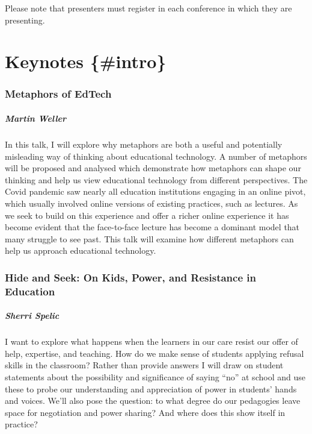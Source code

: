 \documentclass[
]{book}
\begin{document}
Please note that presenters must register in each conference in which they are presenting.

\hypertarget{keynotes-intro}{%
\chapter*{Keynotes \{\#intro\}}\label{keynotes-intro}}

\begin{reflect}
\hypertarget{metaphors-of-edtech}{%
\subsection{Metaphors of EdTech}\label{metaphors-of-edtech}}

\hypertarget{martin-weller}{%
\paragraph{Martin Weller}\label{martin-weller}}

In this talk, I will explore why metaphors are both a useful and
potentially misleading way of thinking about educational technology. A
number of metaphors will be proposed and analysed which demonstrate how
metaphors can shape our thinking and help us view educational technology
from different perspectives. The Covid pandemic saw nearly all education
institutions engaging in an online pivot, which usually involved online
versions of existing practices, such as lectures. As we seek to build on
this experience and offer a richer online experience it has become
evident that the face-to-face lecture has become a dominant model that
many struggle to see past. This talk will examine how different
metaphors can help us approach educational technology.
\end{reflect}

\begin{reflect}
\hypertarget{hide-and-seek-on-kids-power-and-resistance-in-education}{%
\subsection{Hide and Seek: On Kids, Power, and Resistance in
Education}\label{hide-and-seek-on-kids-power-and-resistance-in-education}}

\hypertarget{sherri-spelic}{%
\paragraph{Sherri Spelic}\label{sherri-spelic}}

I want to explore what happens when the learners in our care resist our
offer of help, expertise, and teaching. How do we make sense of students
applying refusal skills in the classroom? Rather than provide answers I
will draw on student statements about the possibility and significance
of saying ``no'' at school and use these to probe our understanding and
appreciation of power in students' hands and voices. We'll also pose the
question: to what degree do our pedagogies leave space for negotiation
and power sharing? And where does this show itself in practice?
\end{reflect}
\end{document}
